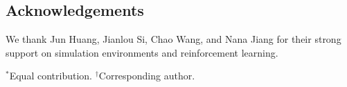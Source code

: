 \documentclass{llmxive}
\begin{document}
\vspace{1.2em}

\subsection*{Acknowledgements}

We thank Jun Huang, Jianlou Si, Chao Wang, and Nana Jiang for their strong support on simulation environments and reinforcement learning. 

\vfill

\noindent
{\footnotesize
$^{*}$Equal contribution. \quad
$^{\dagger}$Corresponding author.
}




\appendix
\end{document}
